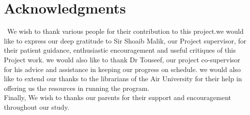 \chapter*{Acknowledgments}

\ We wish to thank various people for their contribution to this project.we would like to express our deep gratitude to Sir Shoaib Malik, our Project supervisor, for their patient guidance, enthusiastic encouragement and useful critiques of this Project work. we would also like to thank Dr Touseef, our project co-supervisor for his advice and assistance in keeping our progress on schedule.
we would also like to extend our thanks to the librarians of the Air University for their help in offering us the resources in running the program.
\\Finally, We wish to thanks our parents for their support and encouragement throughout our study.


\vspace{10mm}



